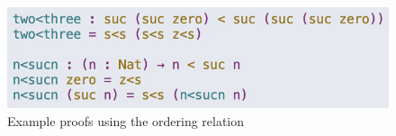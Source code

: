 \begin{figure}[ht]
	\centering
	\includegraphics[scale=0.75,valign=t]{imgs/naturals-ordering-proof.png}%
	\caption{Example proofs using the ordering relation}
	\label{fig:naturals-ordering-proof}
\end{figure}